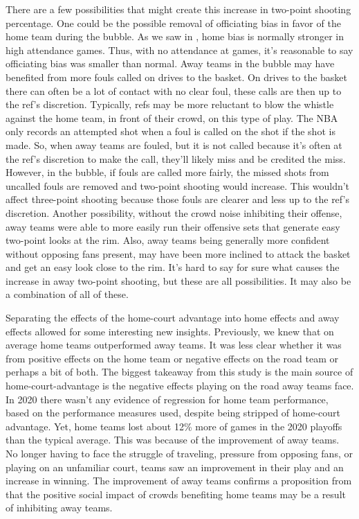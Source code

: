 \documentclass[10pt]{article}
\begin{document}
There are a few possibilities that might create this increase in two-point shooting
percentage. One could be the possible removal of officiating bias in favor of the 
home team during the bubble. As we saw in \cite{Price}, home bias is normally
stronger in high attendance games. Thus, with no attendance at games, it's reasonable
to say officiating bias was smaller than normal. Away teams in the bubble may have benefited from more 
fouls called on drives to the basket. On drives to the basket there can often be a 
lot of contact with no clear foul, these calls are then up to the ref's discretion.
Typically, refs may be more reluctant to blow the whistle against the home team, in
front of their crowd, on this type of play. The NBA only records an attempted shot 
when a foul is called on the shot if the shot is made. So, when away teams are 
fouled, but it is not called because it's often at the ref's discretion to make 
the call, they'll likely miss and be credited the miss. However, in the bubble, if
fouls are called more fairly, the missed shots from uncalled fouls are removed and 
two-point shooting would increase. This wouldn't affect three-point shooting because
those fouls are clearer and less up to the ref's discretion. Another possibility,
without the crowd noise inhibiting their offense, away teams were able to more 
easily run their offensive sets that generate easy two-point looks at the rim. 
Also, away teams being generally more confident without opposing fans present, 
may have been more inclined to attack the basket and get an easy look close to 
the rim. It's hard to say for sure what causes the increase in away two-point shooting,
but these are all possibilities. It may also be a combination of all of these. 


Separating the effects of the home-court advantage into home effects and away
effects allowed for some interesting new insights. Previously, we knew that on
average home teams outperformed away teams. It was less clear whether it was
from positive effects on the home team or negative effects on the road team or
perhaps a bit of both. The biggest takeaway from this study is the main source
of home-court-advantage is the negative effects playing on the road away teams
face. In 2020 there wasn't any evidence of regression for home team performance,
based on the performance measures used, despite being stripped of home-court
advantage. Yet, home teams lost about 12\% more of games in the 2020 playoffs
than the typical average. This was because of the improvement of away teams.
No longer having to face the struggle of traveling, pressure from opposing fans,
or playing on an unfamiliar court, teams saw an improvement in their play and an
increase in winning. The improvement of away teams confirms a proposition from
\citet{Greer} that the positive social impact of crowds benefiting
home teams may be a result of inhibiting away teams.
\end{document}
